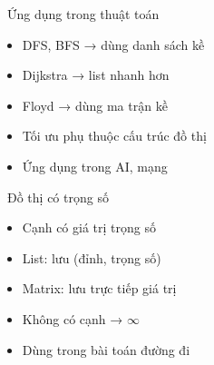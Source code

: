 \documentclass{beamer}
\begin{document}
\begin{frame}{\faCogs\ Ứng dụng trong thuật toán}
\begin{tcolorbox}
\begin{itemize}
\item DFS, BFS → dùng danh sách kề
\item Dijkstra → list nhanh hơn
\item Floyd → dùng ma trận kề
\item Tối ưu phụ thuộc cấu trúc đồ thị
\item Ứng dụng trong AI, mạng
\end{itemize}
\end{tcolorbox}
\end{frame}

\begin{frame}{\faWeight\ Đồ thị có trọng số}
\begin{tcolorbox}
\begin{itemize}
\item Cạnh có giá trị trọng số
\item List: lưu (đỉnh, trọng số)
\item Matrix: lưu trực tiếp giá trị
\item Không có cạnh → $\infty$
\item Dùng trong bài toán đường đi
\end{itemize}
\end{tcolorbox}

\vspace{0.3cm}

\begin{center}
\end{center}

\end{frame}
\end{document}
